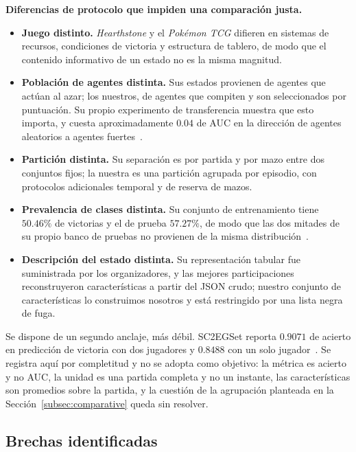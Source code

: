 \documentclass[conference]{IEEEtran}
\begin{document}
\noindent\textbf{Diferencias de protocolo que impiden una comparaci\'on
justa.}
\begin{itemize}
  \item \textbf{Juego distinto.} \emph{Hearthstone} y el \emph{Pok\'emon
        TCG} difieren en sistemas de recursos, condiciones de victoria y
        estructura de tablero, de modo que el contenido informativo de un
        estado no es la misma magnitud.
  \item \textbf{Poblaci\'on de agentes distinta.} Sus estados provienen de
        agentes que act\'uan al azar; los nuestros, de agentes que compiten
        y son seleccionados por puntuaci\'on. Su propio experimento de
        transferencia muestra que esto importa, y cuesta aproximadamente
        $0.04$ de AUC en la direcci\'on de agentes aleatorios a agentes
        fuertes~\cite{janusz_hearthstone_2017}.
  \item \textbf{Partici\'on distinta.} Su separaci\'on es por partida y por
        mazo entre dos conjuntos fijos; la nuestra es una partici\'on
        agrupada por episodio, con protocolos adicionales temporal y de
        reserva de mazos.
  \item \textbf{Prevalencia de clases distinta.} Su conjunto de
        entrenamiento tiene $50.46\%$ de victorias y el de prueba
        $57.27\%$, de modo que las dos mitades de su propio banco de
        pruebas no provienen de la misma
        distribuci\'on~\cite{janusz_hearthstone_2017}.
  \item \textbf{Descripci\'on del estado distinta.} Su representaci\'on
        tabular fue suministrada por los organizadores, y las mejores
        participaciones reconstruyeron caracter\'isticas a partir del JSON
        crudo; nuestro conjunto de caracter\'isticas lo construimos nosotros
        y est\'a restringido por una lista negra de fuga.
\end{itemize}

\noindent Se dispone de un segundo anclaje, m\'as d\'ebil. SC2EGSet reporta
$0.9071$ de acierto en predicci\'on de victoria con dos jugadores y
$0.8488$ con un solo jugador~\cite{bialecki_sc2egset_2023}. Se registra
aqu\'i por completitud y no se adopta como objetivo: la m\'etrica es acierto
y no AUC, la unidad es una partida completa y no un instante, las
caracter\'isticas son promedios sobre la partida, y la cuesti\'on de la
agrupaci\'on planteada en la Secci\'on~\ref{subsec:comparative} queda sin
resolver.

\subsection{Brechas identificadas}
\label{subsec:gaps}
\end{document}
